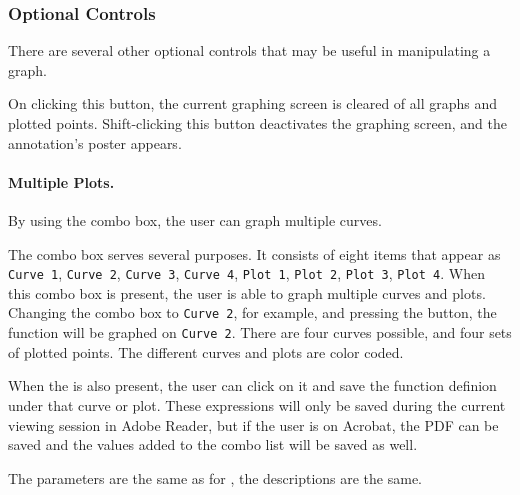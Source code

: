 \documentclass{article}
\begin{document}
\begin{dCmd*}{.5\linewidth}
\end{dCmd*}

\subsubsection{Optional Controls}

There are several other optional controls that may be useful in manipulating
a graph.

\begin{dCmd}{.75\linewidth}
\end{dCmd}
On clicking this button, the current graphing screen is cleared of
all graphs and plotted points. Shift-clicking this button
deactivates the graphing screen, and the annotation's poster
appears.

\paragraph{Multiple Plots.} By using the  combo
box, the user can graph multiple curves.

\begin{dCmd}{.75\linewidth}
\end{dCmd}
The  combo box serves several purposes. It
consists of eight items that appear as \texttt{Curve 1},
\texttt{Curve 2}, \texttt{Curve 3}, \texttt{Curve 4}, \texttt{Plot
1}, \texttt{Plot 2}, \texttt{Plot 3}, \texttt{Plot 4}. When this
combo box is present, the user is able to graph multiple curves and
plots.  Changing the combo box to \texttt{Curve 2}, for example, and
pressing the  button, the function will be graphed on
\texttt{Curve 2}. There are four curves possible, and four sets of
plotted points. The different curves and plots are color coded.

When the  is also present, the user can click on
it and save the function definion under that curve or plot. These
expressions will only be saved during the current viewing session in
Adobe Reader, but if the user is on Acrobat, the PDF can be saved
and the values added to the combo list will be saved as well.

The parameters are the same as for
, the descriptions are the same.
\end{document}
